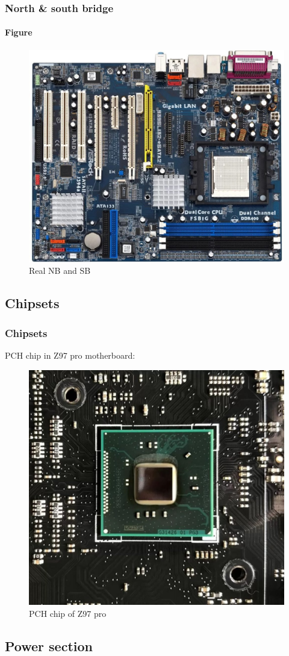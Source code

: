\documentclass[
	12pt, %
]{beamer}
\begin{document}
\begin{frame}
	\frametitle{North \& south bridge}
	\framesubtitle{Figure}
	\begin{figure}
		\centering
		\includegraphics[width=0.65\linewidth]{Images/img8.jpg}
		\caption{Real NB and SB}
		\label{real NB and SB}
	\end{figure}
\end{frame}


\subsection{Chipsets}

\begin{frame}
	\frametitle{Chipsets}
	PCH chip in Z97 pro motherboard:
	\begin{figure}
		\centering
		\includegraphics[width=0.5\linewidth]{Images/img9.jpg}
		\caption{PCH chip of Z97 pro}
		\label{PCH chip of Z97 pro}
	\end{figure}
\end{frame}


\subsection{Power section}
\end{document}
